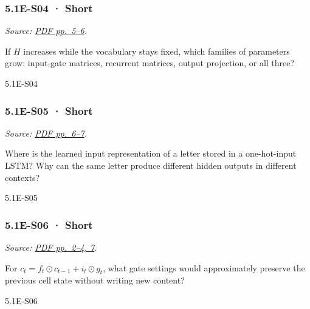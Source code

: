 \noindent\begin{minipage}{\linewidth}

\subsubsection{5.1E-S04 · Short}\label{e-s04-short}

\emph{Source:
\href{../Lecture\%20Slides/5.1.\%20Extra\%20Material.pdf\#page=5}{PDF
pp.~5--6}.}

If \(H\) increases while the vocabulary stays fixed, which families of
parameters grow: input-gate matrices, recurrent matrices, output
projection, or all three?

\begin{solution}[20mm]{5.1E-S04}

\end{solution}
\end{minipage}\par\medskip

\noindent\begin{minipage}{\linewidth}

\subsubsection{5.1E-S05 · Short}\label{e-s05-short}

\emph{Source:
\href{../Lecture\%20Slides/5.1.\%20Extra\%20Material.pdf\#page=6}{PDF
pp.~6--7}.}

Where is the learned input representation of a letter stored in a
one-hot-input LSTM? Why can the same letter produce different hidden
outputs in different contexts?

\begin{solution}[20mm]{5.1E-S05}

\end{solution}
\end{minipage}\par\medskip

\noindent\begin{minipage}{\linewidth}

\subsubsection{5.1E-S06 · Short}\label{e-s06-short}

\emph{Source:
\href{../Lecture\%20Slides/5.1.\%20Extra\%20Material.pdf\#page=2}{PDF
pp.~2--4, 7}.}

For \(c_t=f_t\odot c_{t-1}+i_t\odot g_t\), what gate settings would
approximately preserve the previous cell state without writing new
content?

\begin{solution}[20mm]{5.1E-S06}

\end{solution}
\end{minipage}\par\medskip

